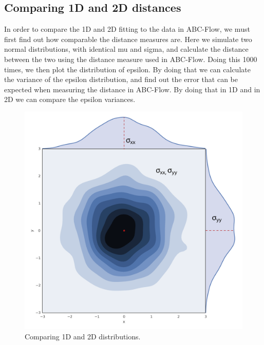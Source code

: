     


\subsection{Comparing 1D and 2D distances}
In order to compare the 1D and 2D fitting to the data in ABC-Flow, we must first find out how comparable the distance measures are. Here we  simulate two normal distributions, with identical mu and sigma, and calculate the distance between the two using the distance measure used in ABC-Flow. Doing this 1000 times, we then plot the distribution of epsilon. By doing that we can calculate the variance of the epsilon distribution, and find out the error that can be expected when measuring the distance in ABC-Flow. By doing that in 1D and in 2D we can compare the epsilon variances. 

\begin{figure}[htbp]
\centering
\includegraphics[scale=0.3]{chapterABCFlow/images/normal_sigma_example.png}
\caption{Comparing 1D and 2D distributions.}
\label{fig:normal_example}
\end{figure}



